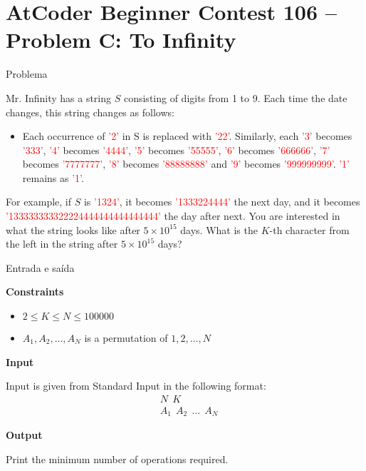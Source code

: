 \section{AtCoder Beginner Contest 106 -- Problem C: To Infinity}

\begin{frame}[fragile]{Problema}

Mr. Infinity has a string $S$ consisting of digits from 1 to 9. Each time the date changes, this 
string changes as follows:

\begin{itemize}
    \item Each occurrence of \textcolor{red}{'2'} in S is replaced with \textcolor{red}{'22'}. Similarly, each \textcolor{red}{'3'} becomes \textcolor{red}{'333'}, \textcolor{red}{'4'} becomes \textcolor{red}{'4444'}, \textcolor{red}{'5'} becomes \textcolor{red}{'55555'}, \textcolor{red}{'6'} becomes \textcolor{red}{'666666'}, \textcolor{red}{'7'} becomes \textcolor{red}{'7777777'}, \textcolor{red}{'8'} becomes \textcolor{red}{'88888888'} and \textcolor{red}{'9'} becomes \textcolor{red}{'999999999'}. \textcolor{red}{'1'} remains as \textcolor{red}{'1'}.
\end{itemize}

For example, if $S$ is \textcolor{red}{'1324'}, it becomes \textcolor{red}{'1333224444'} the next day, and it becomes \textcolor{red}{'133333333322224444444444444444'} the day after next. You are interested in what the string looks like after $5\times 10^{15}$ days. What is the $K$-th character 
from the left in the string after $5\times 10^{15}$ days?

\end{frame}

\begin{frame}[fragile]{Entrada e saída}

\textbf{Constraints}

\begin{itemize}
    \item $2\leq K\leq N\leq 100000$
    \item $A_1, A_2, \ldots, A_N$ is a permutation of $1, 2, \ldots, N$
\end{itemize}

\textbf{Input}

Input is given from Standard Input in the following format:
\begin{align*}
&N\ \ K \\
&A_1\ \ A_2\ \ \ldots\ \ A_N
\end{align*}

\textbf{Output}

Print the minimum number of operations required.

\end{frame}

